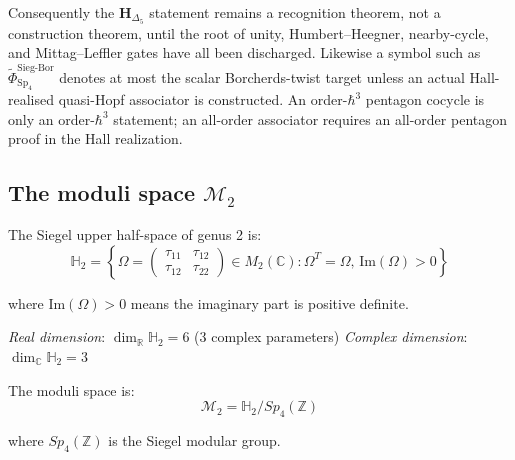 \begin{proposition}
Consequently the $\mathbf H_{\Delta_5}$ statement remains a
recognition theorem, not a construction theorem, until the root of
unity, Humbert--Heegner, nearby-cycle, and Mittag--Leffler gates have
all been discharged.  Likewise a symbol such as
$\widetilde\Phi_{\mathrm{Sp}_4}^{\mathrm{Sieg\text{-}Bor}}$ denotes at
most the scalar Borcherds-twist target unless an actual Hall-realised
quasi-Hopf associator is constructed.  An order-$\hbar^3$ pentagon
cocycle is only an order-$\hbar^3$ statement; an all-order associator
requires an all-order pentagon proof in the Hall realization.
\end{proposition}

\subsection{\texorpdfstring{The moduli space $\mathcal{M}_2$}{The moduli space M-2}}

\begin{definition}
\label{def:siegel-h2}
The Siegel upper half-space of genus 2 is:
\begin{equation}
\mathbb{H}_2 = \left\{\Omega = \begin{pmatrix} \tau_{11} & \tau_{12} \\ \tau_{12} & \tau_{22} \end{pmatrix} \in M_2(\mathbb{C}) :
\Omega^T = \Omega, \, \text{Im}(\Omega) > 0\right\}
\end{equation}

where $\text{Im}(\Omega) > 0$ means the imaginary part is positive definite.

\emph{Real dimension}: $\dim_{\mathbb{R}} \mathbb{H}_2 = 6$ (3 complex parameters)
\emph{Complex dimension}: $\dim_{\mathbb{C}} \mathbb{H}_2 = 3$

The moduli space is:
\begin{equation}
\mathcal{M}_2 = \mathbb{H}_2 / Sp_4(\mathbb{Z})
\end{equation}

where $Sp_4(\mathbb{Z})$ is the Siegel modular group.
\end{definition}

